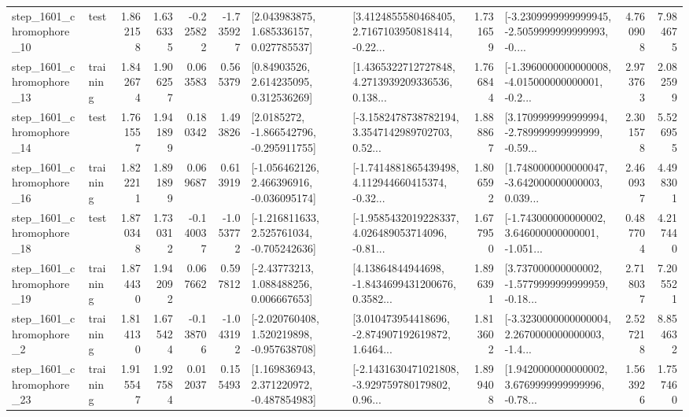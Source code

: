 \begin{tabular}{llrrrrllrlrr}
 step\_1601\_chromophore\_10 &      test &      1.862158 &    1.636335 &     -0.225822 & -1.735927 &     [2.043983875, 1.685336157, 0.027785537] &  [3.4124855580468405, 2.7167103950818414, -0.22... &       1.731659 &  [-3.2309999999999945, -2.5059999999999993, -0.... &            4.760908 &          7.984675 \\
 step\_1601\_chromophore\_13 &  training &      1.842674 &    1.906257 &      0.063583 &  0.565379 &      [0.84903526, 2.614235095, 0.312536269] &  [1.4365322712727848, 4.2713939209336536, 0.138... &       1.766844 &  [-1.3960000000000008, -4.015000000000001, -0.2... &            2.973763 &          2.082599 \\
 step\_1601\_chromophore\_14 &      test &      1.761557 &    1.941899 &      0.180342 &  1.493826 &     [2.0185272, -1.866542796, -0.295911755] &  [-3.1582478738782194, 3.3547142989702703, 0.52... &       1.888867 &  [3.1709999999999994, -2.789999999999999, -0.59... &            2.301578 &          5.526955 \\
 step\_1601\_chromophore\_16 &  training &      1.822211 &    1.891899 &      0.069687 &  0.613919 &   [-1.056462126, 2.466396916, -0.036095174] &  [-1.7414881865439498, 4.112944660415374, -0.32... &       1.806592 &  [1.7480000000000047, -3.642000000000003, 0.039... &            2.460937 &          4.498301 \\
 step\_1601\_chromophore\_18 &      test &      1.870348 &    1.730312 &     -0.140037 & -1.053772 &   [-1.216811633, 2.525761034, -0.705242636] &  [-1.9585432019228337, 4.026489053714096, -0.81... &       1.677950 &  [-1.743000000000002, 3.646000000000001, -1.051... &            0.487704 &          4.217440 \\
 step\_1601\_chromophore\_19 &  training &      1.874430 &    1.942092 &      0.067662 &  0.597812 &     [-2.43773213, 1.088488256, 0.006667653] &  [4.13864844944698, -1.8434699431200676, 0.3582... &       1.896391 &  [3.737000000000002, -1.5779999999999959, -0.18... &            2.718037 &          7.205521 \\
  step\_1601\_chromophore\_2 &  training &      1.814130 &    1.675424 &     -0.138706 & -1.043192 &   [-2.020760408, 1.520219898, -0.957638708] &  [3.010473954418696, -2.874907192619872, 1.6464... &       1.813602 &  [-3.3230000000000004, 2.2670000000000003, -1.4... &            2.527218 &          8.854632 \\
 step\_1601\_chromophore\_23 &  training &      1.915547 &    1.927584 &      0.012037 &  0.155493 &    [1.169836943, 2.371220972, -0.487854983] &  [-2.1431630471021808, -3.929759780179802, 0.96... &       1.899408 &  [1.9420000000000002, 3.6769999999999996, -0.78... &            1.563926 &          1.757460 \\

\end{tabular}
